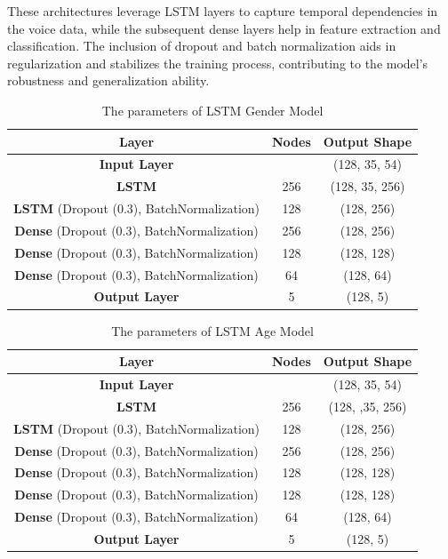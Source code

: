\documentclass[conference, 10pt,onecolumn]{IEEEtran}
\begin{document}
These architectures leverage LSTM layers to capture temporal dependencies in the voice data, while the subsequent dense layers help in feature extraction and classification. The inclusion of dropout and batch normalization aids in regularization and stabilizes the training process, contributing to the model's robustness and generalization ability.

\begin{table}[]
    \centering
    \begin{tabular}{|c|c|c|}
        \hline
        \textbf{Layer} & \textbf{Nodes} & \textbf{Output Shape} \\ \hline
        \textbf{Input Layer} & & (128, 35, 54)\\
        \textbf{LSTM} & 256 & (128, 35, 256)\\
        \textbf{LSTM} (Dropout (0.3), BatchNormalization) & 128 & (128, 256)\\
        \textbf{Dense} (Dropout (0.3), BatchNormalization) & 256 & (128, 256)\\
        \textbf{Dense} (Dropout (0.3), BatchNormalization) & 128 & (128, 128)\\
        \textbf{Dense} (Dropout (0.3), BatchNormalization) & 64 & (128, 64)\\
        \textbf{Output Layer} & 5 & (128, 5)\\
         \hline
    \end{tabular}
    \caption{The parameters of LSTM Gender Model}
    \label{tab:LSTM_Gender}
\end{table}

\begin{table}[]
    \centering
    \begin{tabular}{|c|c|c|}
    \hline
        \textbf{Layer} & \textbf{Nodes} & \textbf{Output Shape} \\ \hline
        \textbf{Input Layer} & & (128, 35, 54)\\
        \textbf{LSTM} & 256 & (128, ,35, 256)\\
        \textbf{LSTM} (Dropout (0.3), BatchNormalization) & 128 & (128, 256)\\
        \textbf{Dense} (Dropout (0.3), BatchNormalization) & 256 & (128, 256)\\
        \textbf{Dense} (Dropout (0.3), BatchNormalization) & 128 & (128, 128)\\
        \textbf{Dense} (Dropout (0.3), BatchNormalization) & 128 & (128, 128)\\
        \textbf{Dense} (Dropout (0.3), BatchNormalization) & 64 & (128, 64)\\
        \textbf{Output Layer} & 5 & (128, 5)\\
        \hline
    \end{tabular}
    \caption{The parameters of LSTM Age Model}
    \label{tab:LSTM_Age}
\end{table}
\end{document}
